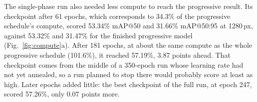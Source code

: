 \documentclass[preprint,12pt]{elsarticle}
\begin{document}
\begin{table}[t]
\centering
\caption{Progressive and single-phase training of Baseline-P2 on the VisDrone
validation set. P and R are precision and recall. Compute is in $10^8$
pixel-epochs.}
\label{tab:schedule}
\small
{}
\end{table}

The single-phase run also needed less compute to reach the progressive result.
Its checkpoint after 61 epochs, which corresponds to 34.3\% of the progressive
schedule's compute, scored 53.34\% mAP@50 and 31.66\% mAP@50:95 at 1280\,px,
against 53.32\% and 31.47\% for the finished progressive model
(Fig.~\ref{fig:compute}a). After 181 epochs, at about the same compute as the
whole progressive schedule (101.6\%), it reached 57.19\%, 3.87 points ahead. That
checkpoint comes from the middle of a 350-epoch run whose learning rate had not
yet annealed, so a run planned to stop there would probably score at least as
high. Later epochs added little: the best checkpoint of the full run, at epoch 247,
scored 57.26\%, only 0.07 points more.
\end{document}
